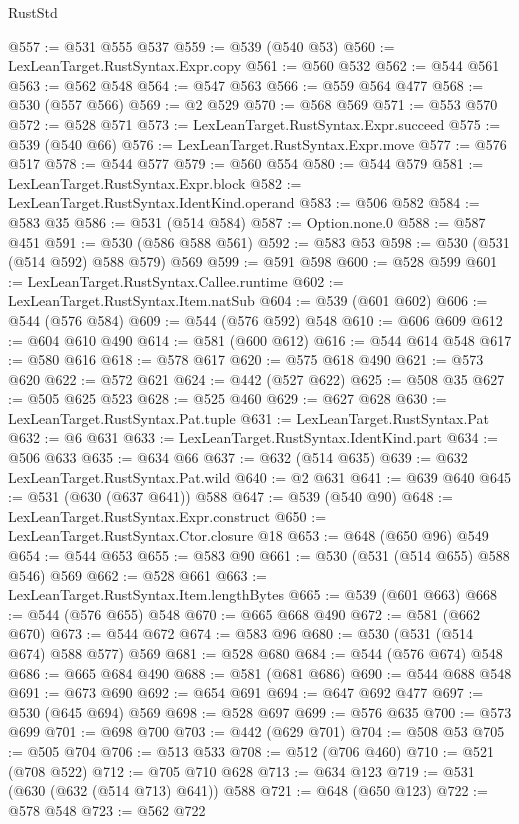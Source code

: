 \begin{lexlean}{RustStd}
\begin{coremodule}
@557 := @531 @555 @537
@559 := @539 (@540 @53)
@560 := LexLeanTarget.RustSyntax.Expr.copy
@561 := @560 @532
@562 := @544 @561
@563 := @562 @548
@564 := @547 @563
@566 := @559 @564 @477
@568 := @530 (@557 @566)
@569 := @2 @529
@570 := @568 @569
@571 := @553 @570
@572 := @528 @571
@573 := LexLeanTarget.RustSyntax.Expr.succeed
@575 := @539 (@540 @66)
@576 := LexLeanTarget.RustSyntax.Expr.move
@577 := @576 @517
@578 := @544 @577
@579 := @560 @554
@580 := @544 @579
@581 := LexLeanTarget.RustSyntax.Expr.block
@582 := LexLeanTarget.RustSyntax.IdentKind.operand
@583 := @506 @582
@584 := @583 @35
@586 := @531 (@514 @584)
@587 := Option.none.{0}
@588 := @587 @451
@591 := @530 (@586 @588 @561)
@592 := @583 @53
@598 := @530 (@531 (@514 @592) @588 @579) @569
@599 := @591 @598
@600 := @528 @599
@601 := LexLeanTarget.RustSyntax.Callee.runtime
@602 := LexLeanTarget.RustSyntax.Item.natSub
@604 := @539 (@601 @602)
@606 := @544 (@576 @584)
@609 := @544 (@576 @592) @548
@610 := @606 @609
@612 := @604 @610 @490
@614 := @581 (@600 @612)
@616 := @544 @614 @548
@617 := @580 @616
@618 := @578 @617
@620 := @575 @618 @490
@621 := @573 @620
@622 := @572 @621
@624 := @442 (@527 @622)
@625 := @508 @35
@627 := @505 @625 @523
@628 := @525 @460
@629 := @627 @628
@630 := LexLeanTarget.RustSyntax.Pat.tuple
@631 := LexLeanTarget.RustSyntax.Pat
@632 := @6 @631
@633 := LexLeanTarget.RustSyntax.IdentKind.part
@634 := @506 @633
@635 := @634 @66
@637 := @632 (@514 @635)
@639 := @632 LexLeanTarget.RustSyntax.Pat.wild
@640 := @2 @631
@641 := @639 @640
@645 := @531 (@630 (@637 @641)) @588
@647 := @539 (@540 @90)
@648 := LexLeanTarget.RustSyntax.Expr.construct
@650 := LexLeanTarget.RustSyntax.Ctor.closure @18
@653 := @648 (@650 @96) @549
@654 := @544 @653
@655 := @583 @90
@661 := @530 (@531 (@514 @655) @588 @546) @569
@662 := @528 @661
@663 := LexLeanTarget.RustSyntax.Item.lengthBytes
@665 := @539 (@601 @663)
@668 := @544 (@576 @655) @548
@670 := @665 @668 @490
@672 := @581 (@662 @670)
@673 := @544 @672
@674 := @583 @96
@680 := @530 (@531 (@514 @674) @588 @577) @569
@681 := @528 @680
@684 := @544 (@576 @674) @548
@686 := @665 @684 @490
@688 := @581 (@681 @686)
@690 := @544 @688 @548
@691 := @673 @690
@692 := @654 @691
@694 := @647 @692 @477
@697 := @530 (@645 @694) @569
@698 := @528 @697
@699 := @576 @635
@700 := @573 @699
@701 := @698 @700
@703 := @442 (@629 @701)
@704 := @508 @53
@705 := @505 @704
@706 := @513 @533
@708 := @512 (@706 @460)
@710 := @521 (@708 @522)
@712 := @705 @710 @628
@713 := @634 @123
@719 := @531 (@630 (@632 (@514 @713) @641)) @588
@721 := @648 (@650 @123)
@722 := @578 @548
@723 := @562 @722

\end{coremodule}
\end{lexlean}
